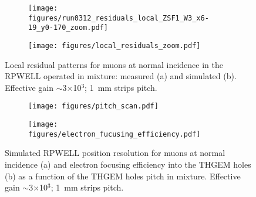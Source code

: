 \begin{figure}[h]
\begin{subfigure}[t]{0.5\textwidth}\caption{}
\texttt{[image: figures/run0312\_residuals\_local\_ZSF1\_W3\_x6-19\_y0-170\_zoom.pdf]}
\end{subfigure}
\begin{subfigure}[t]{0.5\textwidth}\caption{}
\texttt{[image: figures/local\_residuals\_zoom.pdf]}
\end{subfigure}
\caption{Local residual patterns for muons at normal incidence in the RPWELL operated in \nech mixture: measured (a) and simulated (b). Effective gain $\sim$3$\times$10$^3$; 1~mm strips pitch.}\label{fig: local residuals zoom}
\end{figure}

\begin{figure}[h]
\begin{subfigure}[t]{0.5\textwidth}\caption{}
\texttt{[image: figures/pitch\_scan.pdf]}
\end{subfigure}
\begin{subfigure}[t]{0.5\textwidth}\caption{}
\texttt{[image: figures/electron\_fucusing\_efficiency.pdf]}
\end{subfigure}
\caption{Simulated RPWELL position resolution for muons at normal incidence (a) and electron focusing efficiency into the THGEM holes (b) as a function of the THGEM holes pitch in \nech mixture. Effective gain $\sim$3$\times$10$^3$; 1~mm strips pitch.}\label{fig: simulated pitch scan}
\end{figure}



